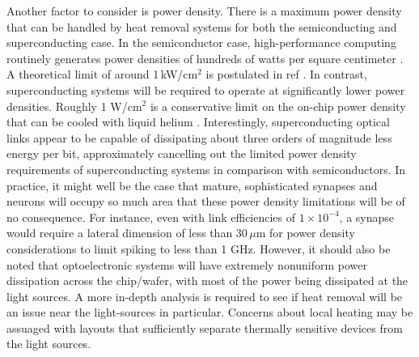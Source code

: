 \documentclass[twocolumn]{article}
\begin{document}
Another factor to consider is power density. There is a maximum power density that can be handled by heat removal systems for both the semiconducting and superconducting case. In the semiconductor case, high-performance computing routinely generates power densities of hundreds of watts per square centimeter \cite{tolpygo2016superconductor}. A theoretical limit of around 1\,kW/cm$^2$ is postulated in ref \cite{zhirnov2003limits}. In contrast, superconducting systems will be required to operate at significantly lower power densities. Roughly 1 W/cm$^2$ is a conservative limit on the on-chip power density that can be cooled with liquid helium \cite{tolpygo2016superconductor}. Interestingly, superconducting optical links appear to be capable of dissipating about three orders of magnitude less energy per bit, approximately cancelling out the limited power density requirements of superconducting systems in comparison with semiconductors. In practice, it might well be the case that mature, sophisticated synapses and neurons will occupy so much area that these power density limitations will be of no consequence. For instance, even with link efficiencies of $1 \times 10^{-4}$, a synapse would require a lateral dimension of less than 30\,$\mu$m for power density considerations to limit spiking to less than 1 GHz. However, it should also be noted that optoelectronic systems will have extremely nonuniform power dissipation across the chip/wafer, with most of the power being dissipated at the light sources. A more in-depth analysis is required to see if heat removal will be an issue near the light-sources in particular. Concerns about local heating may be assuaged with layouts that sufficiently separate thermally sensitive devices from the light sources.
\end{document}
